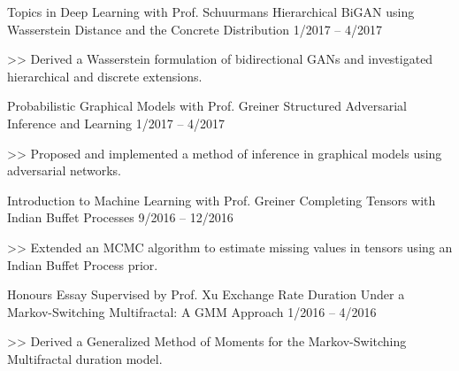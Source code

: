 \begin{cventries}
  \cventry
    {Topics in Deep Learning with Prof. Schuurmans}
    {Hierarchical BiGAN using Wasserstein Distance and
the Concrete Distribution}
    {1/2017 -- 4/2017}
    {
      \begin{cvitems}
        \item[>>] Derived a Wasserstein formulation of bidirectional GANs and investigated hierarchical and discrete extensions.
      \end{cvitems}
    }
  \cventry
    {Probabilistic Graphical Models with Prof. Greiner}
    {Structured Adversarial Inference and Learning}
    {1/2017 -- 4/2017}
    {
      \begin{cvitems}
        \item[>>] Proposed and implemented a method of inference in graphical models using adversarial networks.
      \end{cvitems}
    }
  \cventry
    {Introduction to Machine Learning with Prof. Greiner}
    {Completing Tensors with Indian Buffet Processes}
    {9/2016 -- 12/2016}
    {
      \begin{cvitems}
		\item[>>] Extended an MCMC algorithm to estimate missing values in tensors using an Indian Buffet Process prior.
      \end{cvitems}
    }
  \cventry
    {Honours Essay Supervised by Prof. Xu}
    {Exchange Rate Duration Under a Markov-Switching Multifractal: A GMM Approach}
    {1/2016 -- 4/2016}
    {
      \begin{cvitems}
      	\item[>>] Derived a Generalized Method of Moments for the Markov-Switching Multifractal duration model.
      \end{cvitems}
    }
\end{cventries}

